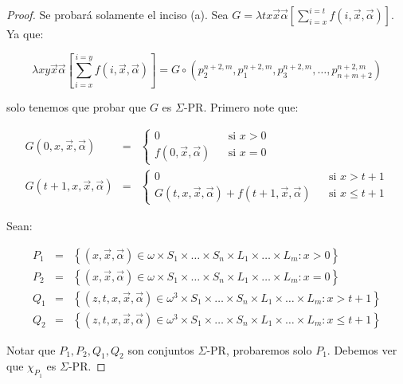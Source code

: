   \begin{proof}
    \PN Se probará solamente el inciso (a). Sea $G = \lambda tx\vec{x}\vec{\alpha} \left[\sum_{i=x}^{i=t} f(i,\vec{x},
    \vec{\alpha})\right]$. Ya que:

    \[
      \lambda xy\vec{x}\vec{\alpha}\left[\sum_{i=x}^{i=y} f(i, \vec{x}, \vec{\alpha})\right] = G \circ \left(
      p_{2}^{n+2,m}, p_{1}^{n+2,m}, p_{3}^{n+2,m}, \dotsc, p_{n+m+2}^{n+2,m}\right)
    \]

    \PN solo tenemos que probar que $G$ es $\Sigma$-PR. Primero note que:

    \begin{eqnarray}
      \nonumber G(0,x,\vec{x},\vec{\alpha}) &=& \left\{
        \begin{array}{lll}
          0 && \text{si } x > 0 \\
          f(0,\vec{x},\vec{\alpha}) && \text{si } x = 0
        \end{array}\right. \\
      \nonumber G(t+1,x,\vec{x},\vec{\alpha}) &=& \left\{
        \begin{array}{lll}
          0 && \text{si } x > t+1 \\
          G(t,x,\vec{x},\vec{\alpha}) + f(t+1,\vec{x},\vec{\alpha}) && \text{si } x \leq t+1
        \end{array} \right.
    \end{eqnarray}

    \PN Sean:

    \begin{eqnarray}
      \nonumber P_{1} &=& \left\{(x,\vec{x},\vec{\alpha}) \in \omega \times S_{1} \times \dotsc \times S_{n} \times
        L_{1} \times \dotsc \times L_{m}: x > 0 \right\} \\
      \nonumber P_{2} &=& \left\{(x,\vec{x},\vec{\alpha}) \in \omega \times S_{1} \times \dotsc \times S_{n} \times
        L_{1} \times \dotsc \times L_{m}: x = 0 \right\} \\
      \nonumber Q_{1} &=& \left\{(z,t,x,\vec{x},\vec{\alpha}) \in \omega^{3} \times S_{1} \times \dotsc \times S_{n}
        \times L_{1} \times \dotsc \times L_{m}: x > t+1\right\} \\
      \nonumber Q_{2} &=& \left\{(z,t,x,\vec{x},\vec{\alpha}) \in \omega^{3} \times S_{1} \times \dotsc \times S_{n}
        \times L_{1} \times \dotsc \times L_{m}: x \leq t+1\right\}
    \end{eqnarray}

    \PN Notar que $P_{1}, P_{2}, Q_{1}, Q_{2}$ son conjuntos $\Sigma$-PR, probaremos solo $P_{1}$. Debemos ver que
    $\chi_{P_{1}}$ es $\Sigma$-PR.


\end{proof}
